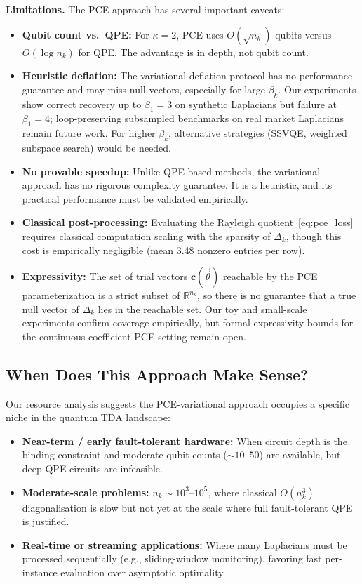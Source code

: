 \documentclass[conference,10pt]{IEEEtran}
\begin{document}
\textbf{Limitations.} The PCE approach has several important caveats:
\begin{itemize}
    \item \textbf{Qubit count vs.\ QPE:} For $\kappa = 2$, PCE uses
    $O(\sqrt{n_k})$ qubits versus $O(\log n_k)$ for QPE. The advantage
    is in depth, not qubit count.
    \item \textbf{Heuristic deflation:} The variational deflation
    protocol has no performance guarantee and may miss null vectors,
    especially for large $\beta_k$. Our experiments show correct
    recovery up to $\beta_1 = 3$ on synthetic Laplacians but failure
    at $\beta_1 = 4$; loop-preserving subsampled benchmarks on
    real market Laplacians remain future work. For higher $\beta_k$,
    alternative strategies (SSVQE, weighted subspace search) would be
    needed.
    \item \textbf{No provable speedup:} Unlike QPE-based methods, the
    variational approach has no rigorous complexity guarantee. It is
    a heuristic, and its practical performance must be validated
    empirically.
    \item \textbf{Classical post-processing:} Evaluating the Rayleigh
    quotient~\eqref{eq:pce_loss} requires classical computation
    scaling with the sparsity of $\Delta_k$, though this cost is
    empirically negligible (mean 3.48 nonzero entries per row).
    \item \textbf{Expressivity:} The set of trial vectors
    $\mathbf{c}(\vec{\theta})$ reachable by the PCE parameterization
    is a strict subset of $\mathbb{R}^{n_k}$, so there is no
    guarantee that a true null vector of $\Delta_k$ lies in the
    reachable set. Our toy and small-scale experiments confirm
    coverage empirically, but formal expressivity bounds for the
    continuous-coefficient PCE setting remain open.
\end{itemize}

\subsection{When Does This Approach Make Sense?}

Our resource analysis suggests the PCE-variational approach occupies
a specific niche in the quantum TDA landscape:
\begin{itemize}
    \item \textbf{Near-term / early fault-tolerant hardware:} When
    circuit depth is the binding constraint and moderate qubit counts
    ($\sim 10$--$50$) are available, but deep QPE circuits are
    infeasible.
    \item \textbf{Moderate-scale problems:} $n_k \sim 10^3$--$10^5$,
    where classical $O(n_k^3)$ diagonalisation is slow but not yet at
    the scale where full fault-tolerant QPE is justified.
    \item \textbf{Real-time or streaming applications:} Where many
    Laplacians must be processed sequentially (e.g., sliding-window
    monitoring), favoring fast per-instance evaluation over
    asymptotic optimality.
\end{itemize}
\end{document}
